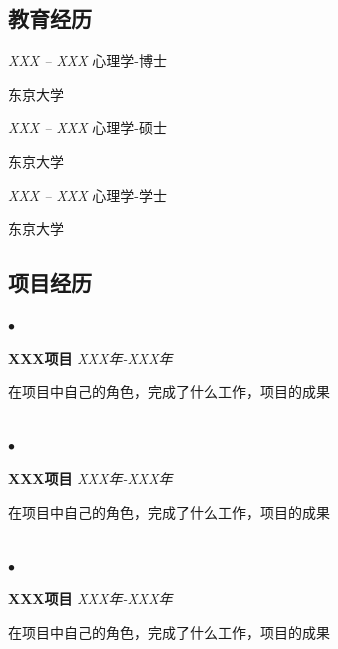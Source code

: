 \documentclass[CJKutf8]{tccv}
\begin{document}
\begin{CJK*}{UTF8}{gbsn}
\begin{CJK*}{UTF8}{gkai}
    \section{\LARGE \textbf{教育经历}}
  \end{CJK*}
  \begin{yearlist}
  \item{\textit{XXX -- XXX}}
    {心理学-博士}
    {\begin{CJK*}{UTF8}{gkai}东京大学\end{CJK*}}
  \item{\textit{XXX -- XXX}}
    {心理学-硕士}
    {\begin{CJK*}{UTF8}{gkai}东京大学\end{CJK*}}
    \item{\textit{XXX -- XXX}}
    {心理学-学士}
    {\begin{CJK*}{UTF8}{gkai}东京大学\end{CJK*}}
  \end{yearlist}

  \begin{CJK*}{UTF8}{gkai}
    \section{\LARGE \textbf{项目经历}}
  \end{CJK*}

  \begin{factlist}   
  \item{$\bullet$}
    {\textbf{XXX项目} \hfill \small\textit{XXX年-XXX年}\\
      \RaggedRight \begin{CJK*}{UTF8}{gkai} \normalsize
        在项目中自己的角色，完成了什么工作，项目的成果\\ \ 
      \end{CJK*}}
      
  \item{$\bullet$}
    {\textbf{XXX项目} \hfill \small\textit{XXX年-XXX年}\\
      \RaggedRight \begin{CJK*}{UTF8}{gkai} \normalsize
        在项目中自己的角色，完成了什么工作，项目的成果\\ \ 
      \end{CJK*}}
      
   \item{$\bullet$}
    {\textbf{XXX项目} \hfill \small\textit{XXX年-XXX年}\\
      \RaggedRight \begin{CJK*}{UTF8}{gkai} \normalsize
        在项目中自己的角色，完成了什么工作，项目的成果\\ \ 
      \end{CJK*}}
      

\end{factlist}
\end{CJK*}
\end{document}
